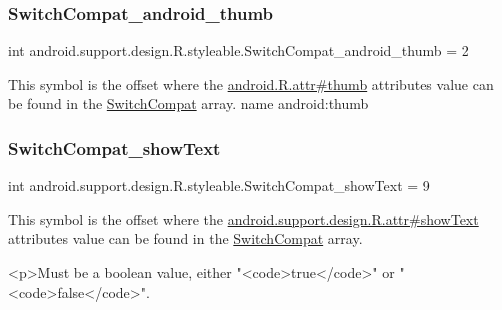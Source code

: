 \subsubsection{\texorpdfstring{Switch\+Compat\+\_\+android\+\_\+thumb}{SwitchCompat\_android\_thumb}}
{\footnotesize\ttfamily int android.\+support.\+design.\+R.\+styleable.\+Switch\+Compat\+\_\+android\+\_\+thumb = 2\hspace{0.3cm}{\ttfamily [static]}}

This symbol is the offset where the \hyperlink{}{android.\+R.\+attr\#thumb} attribute\textquotesingle{}s value can be found in the \hyperlink{classandroid_1_1support_1_1design_1_1R_1_1styleable_a7389a923bf3e321b6b5d10b0589547a1}{Switch\+Compat} array.  name android\+:thumb \mbox{\label{classandroid_1_1support_1_1design_1_1R_1_1styleable_ace1bee7dddfc32341fc2cd3d3275df8e}} 
\subsubsection{\texorpdfstring{Switch\+Compat\+\_\+show\+Text}{SwitchCompat\_showText}}
{\footnotesize\ttfamily int android.\+support.\+design.\+R.\+styleable.\+Switch\+Compat\+\_\+show\+Text = 9\hspace{0.3cm}{\ttfamily [static]}}

This symbol is the offset where the \hyperlink{classandroid_1_1support_1_1design_1_1R_1_1attr_a597e6085eb2b6ab2b0bf020cd0e1fb17}{android.\+support.\+design.\+R.\+attr\#show\+Text} attribute\textquotesingle{}s value can be found in the \hyperlink{classandroid_1_1support_1_1design_1_1R_1_1styleable_a7389a923bf3e321b6b5d10b0589547a1}{Switch\+Compat} array.

\begin{DoxyVerb}      <p>Must be a boolean value, either "<code>true</code>" or "<code>false</code>".
\end{DoxyVerb}
 

